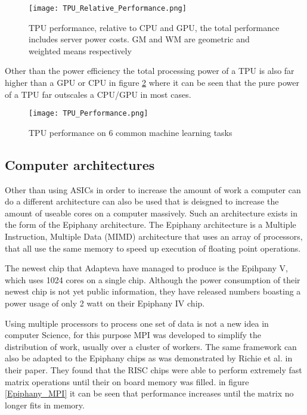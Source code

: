 \begin{figure}
  \texttt{[image: TPU\_Relative\_Performance.png]}
  \caption{TPU performance, relative to CPU and GPU, the total performance includes server power costs. GM and WM are geometric and weighted means respectively \cite{Joup17}}
  \label{TPU_Relative_Performance}
\end{figure}

Other than the power efficiency the total processing power of a TPU is also far higher
than a GPU or CPU in figure \ref{TPU_Performance} where it can be seen that the pure
power of a TPU far outscales a CPU/GPU in most cases.

\begin{figure}
  \texttt{[image: TPU\_Performance.png]}
  \caption{TPU performance on 6 common machine learning tasks\cite{Sato17}}
  \label{TPU_Performance}
\end{figure}


\subsection{Computer architectures}
Other than using ASICs in order to increase the amount of work a computer can do
a different architecture can also be used that is deisgned to increase the amount
of useable cores on a computer massively. Such an architecture exists in the form
of the Epiphany architecture. The Epiphany architecture is a Multiple Instruction,
Multiple Data (MIMD) architecture that uses an array of processors, that all use the
same memory to speed up execution of floating point operations\cite{Olof16}.

The newest chip that Adapteva have managed to produce is the Epihpany V, which uses
1024 cores on a single chip\cite{Olof16}. Although the power consumption of their newest chip
is not yet public information, they have released numbers boasting a power usage of
only 2 watt on their Epiphany IV chip\cite{Adap}.

Using multiple processors to process one set of data is not a new idea in computer
Science, for this purpose MPI was developed to simplify the distribution of work,
usually over a cluster of workers. The same framework can also be adapted to the
Epiphany chips as was demonstrated by Richie et al. in their paper. They found that
the RISC chips were able to perform extremely fast matrix operations until their on board
memory was filled\cite{Rich15}. in figure \ref{Epiphany_MPI} it can be seen that performance increases
until the matrix no longer fits in memory.

